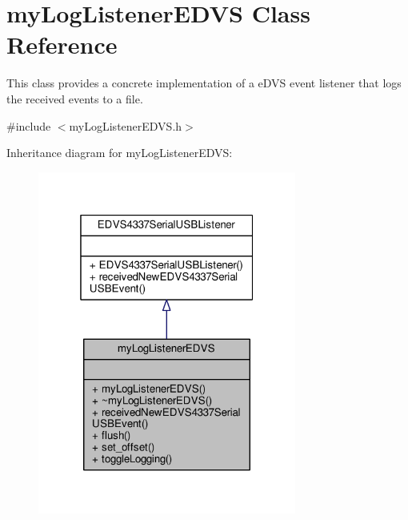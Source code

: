 \hypertarget{classmy_log_listener_e_d_v_s}{}\section{my\+Log\+Listener\+E\+D\+V\+S Class Reference}
\label{classmy_log_listener_e_d_v_s}


This class provides a concrete implementation of a e\+D\+V\+S event listener that logs the received events to a file.  




{\ttfamily \#include $<$my\+Log\+Listener\+E\+D\+V\+S.\+h$>$}



Inheritance diagram for my\+Log\+Listener\+E\+D\+V\+S\+:
\nopagebreak
\begin{figure}[H]
\begin{center}
\leavevmode
\includegraphics[width=241pt]{classmy_log_listener_e_d_v_s__inherit__graph}
\end{center}
\end{figure}


